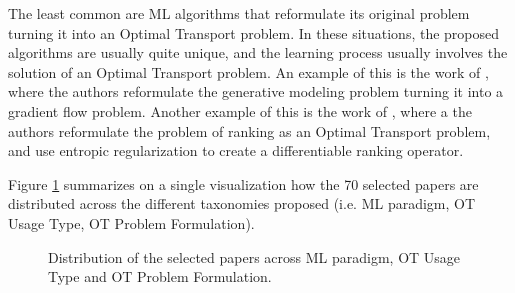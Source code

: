 The least common are ML algorithms that reformulate its original problem
turning it into an Optimal Transport problem. In these situations, the proposed algorithms are usually
quite unique, and the learning process usually involves the solution of an Optimal Transport problem.
An example of this is the work of \citet{liutkus2019sliced}, where the authors reformulate the
generative modeling problem turning it into a gradient flow problem. Another example of this is the 
work of \citet{cuturi19raking}, where a the authors reformulate the problem of ranking as an Optimal Transport
problem, and use entropic regularization to create a differentiable ranking operator.

Figure \ref{fig:overview-ot-ml} summarizes on a single visualization
how the 70 selected papers are distributed across the different taxonomies proposed
(i.e. ML paradigm, OT Usage Type, OT Problem Formulation).

\begin{figure}[H]
  \centering
  \def\svgscale{0.57}
  
  \caption{Distribution of the selected papers across ML paradigm, OT Usage Type and
  OT Problem Formulation.
  }
  \label{fig:overview-ot-ml}
\end{figure}